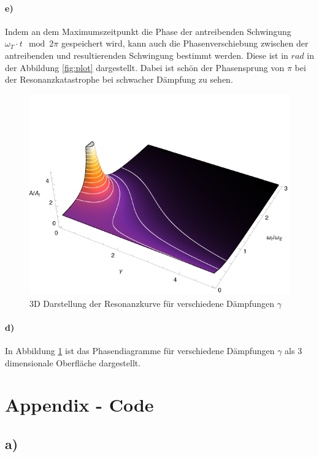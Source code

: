 \paragraph*{e)} Indem an dem Maximumszeitpunkt die Phase der antreibenden Schwingung $\omega_T \cdot t \mod 2\pi$ gespeichert wird, kann auch die Phasenverschiebung zwischen der antreibenden und resultierenden Schwingung bestimmt werden.
Diese ist in $rad$ in der Abbildung \ref{fig:plot} dargestellt.
Dabei ist schön der Phasensprung von $\pi$ bei der Resonanzkatastrophe bei schwacher Dämpfung zu sehen.

\begin{figure}[p]
	\centering
	\includegraphics[width=400pt]{C_3D.pdf}
	\caption{3D Darstellung der Resonanzkurve für verschiedene Dämpfungen $\gamma$}
	\label{fig:3d}
\end{figure}
\paragraph*{d)}
In Abbildung \ref{fig:3d} ist das Phasendiagramme für verschiedene Dämpfungen $\gamma$ als 3 dimensionale Oberfläche dargestellt.

\clearpage
\section*{Appendix - Code}
\subsection*{a)}


